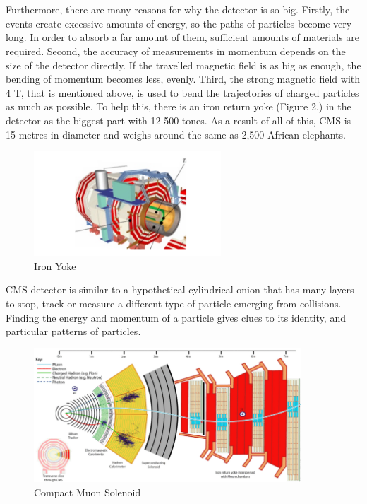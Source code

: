 \documentclass[a4paper,10pt]{article}
\begin{document}
\\\\
Furthermore, there are many reasons for why the detector is so big. Firstly, the events create excessive amounts of energy, so the paths of particles
become very long. In order to absorb a far amount of them, sufficient amounts of materials are required. Second, the accuracy of measurements in momentum
depends on the size of the detector directly. If the travelled magnetic field is as big as enough, the bending of momentum becomes less, evenly.
Third, the strong magnetic field with 4 T, that is mentioned above, is used to bend the trajectories of charged particles as much as possible. To help this, there is an iron
return yoke (Figure 2.) in the detector as the biggest part with 12 500 tones. As a result of all of this, CMS is 15 metres in diameter and weighs around
the same as 2,500 African elephants.
\begin{figure}[H]
\begin{center}
\includegraphics[width=7cm]{a2.png}
\end{center}
\caption{Iron Yoke}
\end{figure}




CMS detector is similar to a hypothetical cylindrical onion that has many layers to stop, track or measure a different type
of particle emerging from collisions. Finding the energy and momentum of a particle gives clues to its identity, and particular
patterns of particles. 

\begin{figure}[H]
\begin{center}
\includegraphics[width=10cm]{r3.png}
\end{center}
\caption{Compact Muon Solenoid }
\end{figure}
\end{document}
